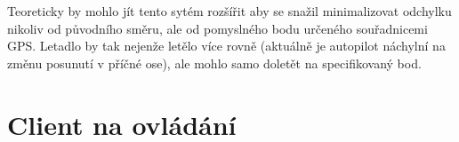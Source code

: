 \documentclass[a4paper,oneside,12pt]{report}
\let\openright=\clearpage
\begin{document}
Teoreticky by mohlo jít tento sytém rozšířit aby se snažil minimalizovat odchylku nikoliv od původního směru, ale od pomyslného bodu určeného souřadnicemi GPS.
Letadlo by tak nejenže letělo více rovně (aktuálně je autopilot náchylní na změnu posunutí v příčné ose), ale mohlo samo doletět na specifikovaný bod.




\chapter{Client na ovládání}




\chapter*{}
\setcounter{page}{6} %





\listoffigures
\openright
\end{document}
